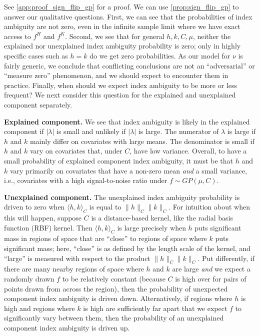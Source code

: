 See \cref{app:proof_sign_flip_gp} for a proof.
We can use \cref{prop:sign_flip_gp} to answer our qualitative questions.
First, we can see that the probabilities of index ambiguity are not zero, even in the infinite sample limit where we have exact access to $f^H$ and $f^K$.
Second, we see that for general $h,k, C,\mu$, neither the explained nor unexplained index ambiguity probability is zero; only in highly specific cases such as $h = k$ do we get zero probabilities.
As our model for $\nu$ is fairly generic, we conclude that conflicting conclusions are not an ``adversarial'' or ``measure zero'' phenomenon, and we should expect to encounter them in practice.
Finally, when should we expect index ambiguity to be more or less frequent?
We next consider this question for the explained and unexplained component separately.

\textbf{Explained component.} We see that index ambiguity is likely in the explained component if $| \lambda |$ is small and unlikely if $|\lambda|$ is large.
The numerator of $\lambda$ is large if $h$ and $k$ mainly differ on covariates with large means.
The denominator is small if $h$ and $k$ vary on covariates that, under $C$, have low variance.
Overall, to have a small probability of explained component index ambiguity, it must be that $h$ and $k$ vary primarily on covariates that have a non-zero mean \emph{and} a small variance, i.e., covariates with a high signal-to-noise ratio under $f \sim GP(\mu, C)$.

\textbf{Unexplained component.}
The unexplained index ambiguity probability is driven to zero when $\langle h,k\rangle_C$ is equal to $\| h\|_C \| k \|_C$. 
For intuition about when this will happen, suppose $C$ is a distance-based kernel, like the radial basis function (RBF) kernel. 
Then $\langle h,k\rangle_C$ is large precisely when $h$ puts significant mass in regions of space that are ``close'' to regions of space where $k$ puts significant mass; here, ``close'' is as defined by the length scale of the kernel, and ``large'' is measured with respect to the product $\|h\|_C \|k\|_C$. 
Put differently, if there are many nearby regions of space where $h$ and $k$ are large \emph{and} we expect a randomly drawn $f$ to be relatively constant (because $C$ is high over for pairs of points drawn from across the region), then the probability of unexpected  component index ambiguity is driven down.
Alternatively, if regions where $h$ is high and regions where $k$ is high are sufficiently far apart that we expect $f$ to significantly vary between them, then the probability of an unexplained component index ambiguity is driven up.

